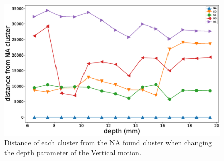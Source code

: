 \documentclass[]{interact}
\theoremstyle{plain}%
\theoremstyle{definition}
\theoremstyle{remark}
\begin{document}
 
\begin{figure}[]
	\centering
	\includegraphics[width=.75\textwidth]{./figs/phantom2propertiesVertical_na-dist}
	\caption{Distance of each cluster from the NA found cluster when changing the depth parameter of the Vertical motion.}
	\label{na_dist}
\end{figure}
 
\end{document}
